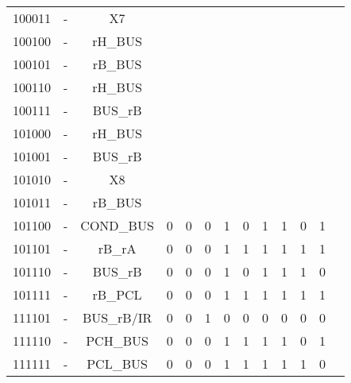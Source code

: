 \documentclass[10pt]{book}
\begin{document}
\begin{longtable}{|c|c|c||c|c|c||c|c|c|c|c|c|c|}
100011 & - 		& X7 			& \\
100100 & - 		& rH\_BUS		& \\
100101 & - 		& rB\_BUS		& \\
100110 & - 		& rH\_BUS		& \\
100111 & - 		& BUS\_rB 		& \\
101000 & - 		& rH\_BUS		& \\
101001 & - 		& BUS\_rB 		& \\
101010 & - 		& X8 			& \\
101011 & - 		& rB\_BUS		& \\
101100 & - 		& COND\_BUS	& 0 & 0 & 0  & 1 & 0 & 1 & 1 & 0 & 1 \\
101101 & - 		& rB\_rA		& 0 & 0 & 0  & 1 & 1 & 1 & 1 & 1 & 1 \\
101110 & - 		& BUS\_rB 		& 0 & 0 & 0  & 1 & 0 & 1 & 1 & 1 & 0 \\
101111 & - 		& rB\_PCL		& 0 & 0 & 0  & 1 & 1 & 1 & 1 & 1 & 1 \\
111101 & - 		& BUS\_rB/IR	& 0 & 0 & 1  & 0 & 0 & 0 & 0 & 0 & 0 \\
111110 & - 	 	& PCH\_BUS		& 0 & 0 & 0  & 1 & 1 & 1 & 1 & 0 & 1 \\
111111 & - 	 	& PCL\_BUS		& 0 & 0 & 0  & 1 & 1 & 1 & 1 & 1 & 0 \\
\end{longtable}
\end{document}
